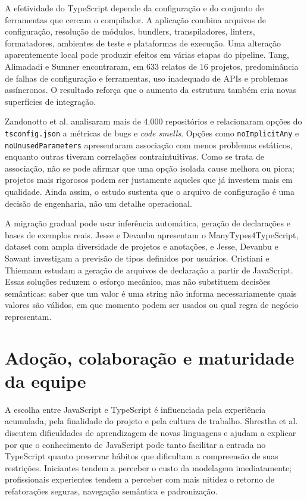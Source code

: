 A efetividade do TypeScript depende da configuração e do conjunto de ferramentas que cercam o compilador. A aplicação combina arquivos de configuração, resolução de módulos, bundlers, transpiladores, linters, formatadores, ambientes de teste e plataformas de execução. Uma alteração aparentemente local pode produzir efeitos em várias etapas do pipeline. Tang, Alimadadi e Sumner \cite{tang2026ecosystem} encontraram, em 633 relatos de 16 projetos, predominância de falhas de configuração e ferramentas, uso inadequado de APIs e problemas assíncronos. O resultado reforça que o aumento da estrutura também cria novas superfícies de integração.

Zandonotto et al. \cite{zandonotto2026compiler} analisaram mais de 4.000 repositórios e relacionaram opções do \texttt{tsconfig.json} a métricas de bugs e \textit{code smells}. Opções como \texttt{noImplicitAny} e \texttt{noUnusedParameters} apresentaram associação com menos problemas estáticos, enquanto outras tiveram correlações contraintuitivas. Como se trata de associação, não se pode afirmar que uma opção isolada cause melhora ou piora; projetos mais rigorosos podem ser justamente aqueles que já investem mais em qualidade. Ainda assim, o estudo sustenta que o arquivo de configuração é uma decisão de engenharia, não um detalhe operacional.

A migração gradual pode usar inferência automática, geração de declarações e bases de exemplos reais. Jesse e Devanbu \cite{jesse2022manytypes} apresentam o ManyTypes4TypeScript, dataset com ampla diversidade de projetos e anotações, e Jesse, Devanbu e Sawant \cite{jesse2023types} investigam a previsão de tipos definidos por usuários. Cristiani e Thiemann \cite{cristiani2021declarations} estudam a geração de arquivos de declaração a partir de JavaScript. Essas soluções reduzem o esforço mecânico, mas não substituem decisões semânticas: saber que um valor é uma string não informa necessariamente quais valores são válidos, em que momento podem ser usados ou qual regra de negócio representam.

\section{Adoção, colaboração e maturidade da equipe}

A escolha entre JavaScript e TypeScript é influenciada pela experiência acumulada, pela finalidade do projeto e pela cultura de trabalho. Shrestha et al. \cite{shrestha2022} discutem dificuldades de aprendizagem de novas linguagens e ajudam a explicar por que o conhecimento de JavaScript pode tanto facilitar a entrada no TypeScript quanto preservar hábitos que dificultam a compreensão de suas restrições. Iniciantes tendem a perceber o custo da modelagem imediatamente; profissionais experientes tendem a perceber com mais nitidez o retorno de refatorações seguras, navegação semântica e padronização.

